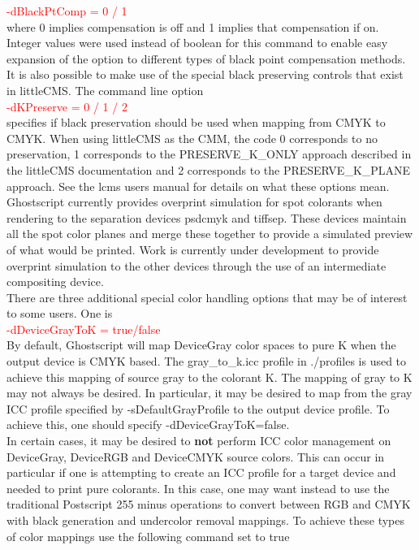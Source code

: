 \documentclass[12pt,notitlepage]{article}
\begin{document}
\textcolor{red}{-dBlackPtComp = 0 / 1}\\

\noindent where 0 implies compensation is off and 1 implies that compensation if on.  Integer values were used instead of boolean for this command to enable easy expansion of the option to different types of black point compensation methods.\\

It is also possible to make use of the special black preserving controls that exist in littleCMS.  The command line option\\

\textcolor{red}{-dKPreserve = 0 / 1 / 2}\\

\noindent specifies if black preservation should be used when mapping from CMYK to CMYK.   When using littleCMS as the CMM, the code 0
corresponds to no preservation, 1 corresponds to the PRESERVE\_K\_ONLY approach described in the littleCMS documentation and 2 corresponds to the PRESERVE\_K\_PLANE approach.
See the lcms users manual for details on what these options mean.\\

Ghostscript currently provides overprint simulation for spot colorants when rendering to the separation devices psdcmyk and tiffsep.  These devices maintain all the spot color planes and merge these together to provide a simulated preview of what would be printed.   Work is currently under development to provide overprint simulation to the other devices through the use of an intermediate compositing device.\\

There are three additional special color handling options that may be of interest to some users.  One is\\

\textcolor{red}{-dDeviceGrayToK = true/false}\\

\noindent By default, Ghostscript will map DeviceGray color spaces to pure K when the output device is CMYK based. The gray\_to\_k.icc profile in ./profiles is used to achieve this mapping of source gray to the colorant K.  The mapping of gray to K may not always be desired. In particular, it may be desired to map from the gray ICC profile specified by -sDefaultGrayProfile to the output device profile. To achieve this, one should specify -dDeviceGrayToK=false.\\

In certain cases, it may be desired to {\bf not} perform ICC color management on DeviceGray, DeviceRGB and DeviceCMYK source colors.  This can occur in particular if one is attempting to create an ICC profile for a target device and needed to print pure colorants.  In this case, one may want instead to use the traditional Postscript 255 minus operations to convert between RGB and CMYK with black generation and undercolor removal mappings.  To achieve these types of color mappings use the following command set to true\\
\end{document}
